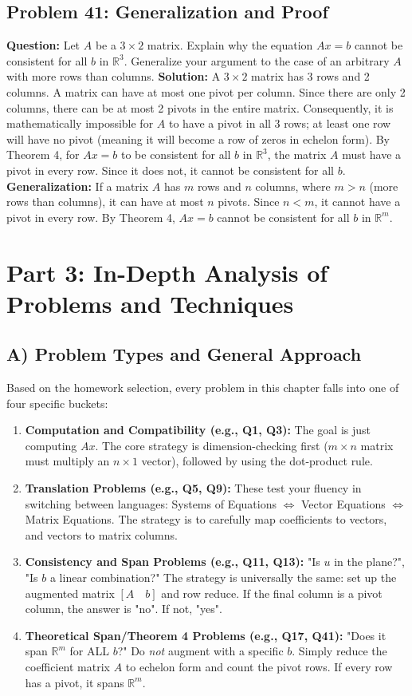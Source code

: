 \documentclass{article}
\begin{document}
\subsection{Problem 41: Generalization and Proof}
\textbf{Question:} Let $A$ be a $3 \times 2$ matrix. Explain why the equation $Ax = b$ cannot be consistent for all $b$ in $\mathbb{R}^3$. Generalize your argument to the case of an arbitrary $A$ with more rows than columns.
\textbf{Solution:}
A $3 \times 2$ matrix has 3 rows and 2 columns. A matrix can have at most one pivot per column. Since there are only 2 columns, there can be at most 2 pivots in the entire matrix.
Consequently, it is mathematically impossible for $A$ to have a pivot in all 3 rows; at least one row will have no pivot (meaning it will become a row of zeros in echelon form).
By Theorem 4, for $Ax = b$ to be consistent for all $b$ in $\mathbb{R}^3$, the matrix $A$ must have a pivot in every row. Since it does not, it cannot be consistent for all $b$.
\textbf{Generalization:} If a matrix $A$ has $m$ rows and $n$ columns, where $m > n$ (more rows than columns), it can have at most $n$ pivots. Since $n < m$, it cannot have a pivot in every row. By Theorem 4, $Ax = b$ cannot be consistent for all $b$ in $\mathbb{R}^m$.

\newpage
\section{Part 3: In-Depth Analysis of Problems and Techniques}

\subsection{A) Problem Types and General Approach}
Based on the homework selection, every problem in this chapter falls into one of four specific buckets:
\begin{enumerate}
    \item \textbf{Computation and Compatibility (e.g., Q1, Q3):} The goal is just computing $Ax$. The core strategy is dimension-checking first ($m \times n$ matrix must multiply an $n \times 1$ vector), followed by using the dot-product rule.
    \item \textbf{Translation Problems (e.g., Q5, Q9):} These test your fluency in switching between languages: Systems of Equations $\iff$ Vector Equations $\iff$ Matrix Equations. The strategy is to carefully map coefficients to vectors, and vectors to matrix columns. 
    \item \textbf{Consistency and Span Problems (e.g., Q11, Q13):} "Is $u$ in the plane?", "Is $b$ a linear combination?" The strategy is universally the same: set up the augmented matrix $[A \quad b]$ and row reduce. If the final column is a pivot column, the answer is "no". If not, "yes".
    \item \textbf{Theoretical Span/Theorem 4 Problems (e.g., Q17, Q41):} "Does it span $\mathbb{R}^m$ for ALL $b$?" Do \textit{not} augment with a specific $b$. Simply reduce the coefficient matrix $A$ to echelon form and count the pivot rows. If every row has a pivot, it spans $\mathbb{R}^m$.
\end{enumerate}
\end{document}
